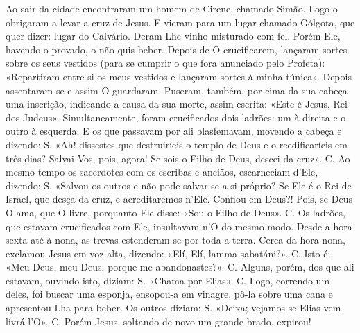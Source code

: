 \begin{paracol}{2}
{Ao sair da cidade encontraram um homem de Cirene, chamado Simão. Logo o obrigaram a levar a cruz de Jesus. E vieram para um lugar chamado Gólgota, que quer dizer: lugar do Calvário. Deram-Lhe vinho misturado com fel. Porém Ele, havendo-o provado, o não quis beber. Depois de O crucificarem, lançaram sortes sobre os seus vestidos (para se cumprir o que fora anunciado pelo Profeta): «Repartiram entre si os meus vestidos e lançaram sortes à minha túnica». Depois assentaram-se e assim O guardaram. Puseram, também, por cima da sua cabeça uma inscrição, indicando a causa da sua morte, assim escrita: «Este é Jesus, Rei dos Judeus». Simultaneamente, foram crucificados dois ladrões: um à direita e o outro à esquerda. E os que passavam por ali blasfemavam, movendo a cabeça e dizendo: {\redx S.} «Ah! dissestes que destruiríeis o templo de Deus e o reedificaríeis em três dias? Salvai-Vos, pois, agora! Se sois o Filho de Deus, descei da cruz». {\redx C.} Ao mesmo tempo os sacerdotes com os escribas e anciãos, escarneciam d’Ele, dizendo: {\redx S.} «Salvou os outros e não pode salvar-se a si próprio? Se Ele é o Rei de Israel, que desça da cruz, e acreditaremos n’Ele. Confiou em Deus?! Pois, se Deus O ama, que O livre, porquanto Ele disse: «Sou o Filho de Deus». {\redx C.} Os ladrões, que estavam crucificados com Ele, insultavam-n’O do mesmo modo. Desde a hora sexta até à nona, as trevas estenderam-se por toda a terra. Cerca da hora nona, exclamou Jesus em voz alta, dizendo: \cruz «Elí, Elí, lamma sabatáni?». {\redx C.} Isto é: \cruz «Meu Deus, meu Deus, porque me abandonastes?». {\redx C.} Alguns, porém, dos que ali estavam, ouvindo isto, diziam: {\redx S.} «Chama por Elias». {\redx C.} Logo, correndo um deles, foi buscar uma esponja, ensopou-a em vinagre, pô-la sobre uma cana e apresentou-Lha para beber. Os outros diziam: {\redx S.} «Deixa; vejamos se Elias vem livrá-l’O». {\redx C.} Porém Jesus, soltando de novo um grande brado, expirou!
}\switchcolumn*{}\switchcolumn{}\switchcolumn*{}
\end{paracol}
